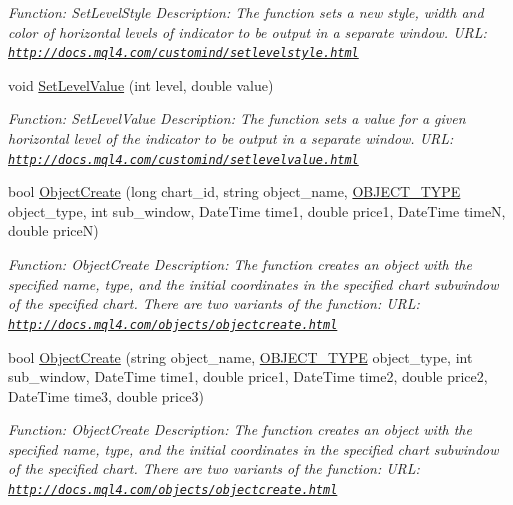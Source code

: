 \begin{DoxyCompactItemize}
\begin{DoxyCompactList}\small\item\em Function\+: Set\+Level\+Style Description\+: The function sets a new style, width and color of horizontal levels of indicator to be output in a separate window. U\+RL\+: \href{http://docs.mql4.com/customind/setlevelstyle.html}{\tt http\+://docs.\+mql4.\+com/customind/setlevelstyle.\+html} \end{DoxyCompactList}\item 
void \hyperlink{class_m_q_l4_c_sharp_1_1_base_1_1_m_q_l_base_a6162a857e76fef826ef8b56c6b353ddc}{Set\+Level\+Value} (int level, double value)
\begin{DoxyCompactList}\small\item\em Function\+: Set\+Level\+Value Description\+: The function sets a value for a given horizontal level of the indicator to be output in a separate window. U\+RL\+: \href{http://docs.mql4.com/customind/setlevelvalue.html}{\tt http\+://docs.\+mql4.\+com/customind/setlevelvalue.\+html} \end{DoxyCompactList}\item 
bool \hyperlink{class_m_q_l4_c_sharp_1_1_base_1_1_m_q_l_base_a0c93aedf4ee372a4180e18ad561ecb9c}{Object\+Create} (long chart\+\_\+id, string object\+\_\+name, \hyperlink{namespace_m_q_l4_c_sharp_1_1_base_1_1_enums_a357639d93cdcbbcabdac179ac6242dd7}{O\+B\+J\+E\+C\+T\+\_\+\+T\+Y\+PE} object\+\_\+type, int sub\+\_\+window, Date\+Time time1, double price1, Date\+Time timeN, double priceN)
\begin{DoxyCompactList}\small\item\em Function\+: Object\+Create Description\+: The function creates an object with the specified name, type, and the initial coordinates in the specified chart subwindow of the specified chart. There are two variants of the function\+: U\+RL\+: \href{http://docs.mql4.com/objects/objectcreate.html}{\tt http\+://docs.\+mql4.\+com/objects/objectcreate.\+html} \end{DoxyCompactList}\item 
bool \hyperlink{class_m_q_l4_c_sharp_1_1_base_1_1_m_q_l_base_ad3c72151c6b00593d2169c91b55da13f}{Object\+Create} (string object\+\_\+name, \hyperlink{namespace_m_q_l4_c_sharp_1_1_base_1_1_enums_a357639d93cdcbbcabdac179ac6242dd7}{O\+B\+J\+E\+C\+T\+\_\+\+T\+Y\+PE} object\+\_\+type, int sub\+\_\+window, Date\+Time time1, double price1, Date\+Time time2, double price2, Date\+Time time3, double price3)
\begin{DoxyCompactList}\small\item\em Function\+: Object\+Create Description\+: The function creates an object with the specified name, type, and the initial coordinates in the specified chart subwindow of the specified chart. There are two variants of the function\+: U\+RL\+: \href{http://docs.mql4.com/objects/objectcreate.html}{\tt http\+://docs.\+mql4.\+com/objects/objectcreate.\+html} \end{DoxyCompactList}\item 

\end{DoxyCompactItemize}
